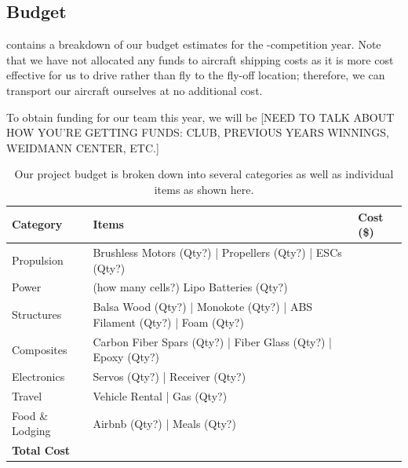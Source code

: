 \documentclass[proposal]{byu-aero}
\begin{document}
\subsection{Budget}
\label{ssec:Budget}

 contains a breakdown of our budget estimates for the \the\year-\NextYear competition year. Note that we have not allocated any funds to aircraft shipping costs as it is more cost effective for us to drive rather than fly to the fly-off location; therefore, we can transport our aircraft ourselves at no additional cost. %

To obtain funding for our team this year, we will be {\color{BYUred}[NEED TO TALK ABOUT HOW YOU'RE GETTING FUNDS: CLUB, PREVIOUS YEARS WINNINGS, WEIDMANN CENTER, ETC.]} %
\lipsum[2]

\begin{table}[htb!]
	\centering
	\renewcommand{\arraystretch}{1.2}
	\caption{Our project budget is broken down into several categories as well as individual items as shown here.}
	\label{tab:budget}
	\begin{tabular}{ |l|l|l| } 
		\hline
		\rowcolor{BYUbluemid}
		Category & Items & Cost (\$) \\ 
		\hline
		Propulsion &  Brushless Motors (Qty?) | Propellers (Qty?) | ESCs (Qty?) &  \\
		\hline
		Power & (how many cells?) Lipo Batteries (Qty?) & \\ 
		\hline
		Structures & Balsa Wood (Qty?) | Monokote (Qty?) | ABS Filament (Qty?) | Foam (Qty?) & \\ 
		\hline
		Composites & Carbon Fiber Spars (Qty?) | Fiber Glass (Qty?) | Epoxy (Qty?) &  \\ 
		\hline
		Electronics & Servos (Qty?) | Receiver (Qty?) &  \\
		\hline
		Travel & Vehicle Rental | Gas (Qty?) &  \\
		\hline
		Food \& Lodging & Airbnb (Qty?) | Meals (Qty?) &  \\
		\hline 
		\textbf{Total Cost} & & \textbf{} \\ 
		\hline
		
	\end{tabular}
\end{table}
\end{document}
